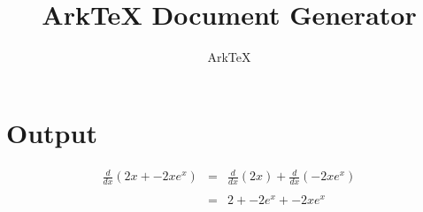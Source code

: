\documentclass[dvips, 12pt, twoside]{article}
\begin{document}
\title{ArkTeX Document Generator}
\author{ArkTeX}
\maketitle

\medskip

\section*{Output}
\begin{Large}
\begin{eqnarray*}
\frac{d}{dx}(2x+-2xe^{x})&=&\frac{d}{dx}(2x)+\frac{d}{dx}(-2xe^{x})\\
\\
&=&2+-2e^{x} + -2xe^{x}\\
\\
\end{eqnarray*}
\end{Large}
\end{document}
